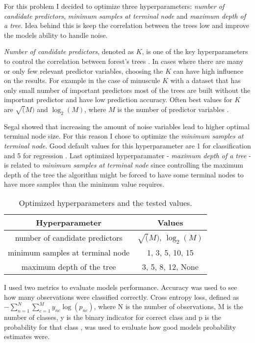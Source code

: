 For this problem I decided to optimize three hyperparameters: \textit{number of candidate predictors}, \textit{minimum samples at terminal node} and \textit{maximum depth of a tree}. Idea behind this is keep the correlation between the trees low and improve the models ability to handle noise.

\textit{Number of candidate predictors}, denoted as $K$, is one of the key hyperparameters to control the correlation between forest's trees \cite{probst2018hyperparameters}.
In cases where there are many or only few relevant predictor variables, choosing the $K$ can have high influence on the results. For example in the case of minuscule $K$ with a dataset that has only small number of important predictors most of the trees are built without the important predictor and have low prediction accuracy. \cite{bernard2009influence} Often best values for $K$ are $\sqrt(M)$ and $\log_2(M)$, where $M$ is the number of predictor variables \cite{bernard2009influence}.

Segal \cite{segal2004machine} showed that increasing the amount of noise variables lead to higher optimal terminal node size. For this reason I chose to optimize the \textit{minimum samples at terminal node}. Good default values for this hyperparameter are 1 for classification and 5 for regression \cite{probst2018hyperparameters}. Last optimized hyperparamater - \textit{maximum depth of a tree} - is related to \textit{minimum samples at terminal node} since controlling the maximum depth of the tree the algorithm might be forced to have some terminal nodes to have more samples than the minimum value requires.

\begin{table}
    \caption{Optimized hyperparameters and the tested values.}
    \begin{tabular}{ | c | c |}
    \hline
    Hyperparameter & Values\\
    \hline
    number of candidate predictors & $\sqrt(M)$, $\log_2(M)$\\
    minimum samples at terminal node & 1, 3, 5, 10, 15\\
    maximum depth of the tree & 3, 5, 8, 12, None\\
    \hline
   \end{tabular}
   \label{tab:hyperparam}
\end{table}

I used two metrics to evaluate models performance. Accuracy was used to see how many observations were classified correctly. Cross entropy loss, defined as $- \sum _ { n = 1 } ^ { N }\sum _ { c = 1 } ^ { M } y _ { nc } \log \left( p _ { nc } \right)$, where N is the number of observations, M is the number of classes, y is the binary indicator for correct class and p is the probability for that class \cite{nasrabadi2007pattern}, was used to evaluate how good models probability estimates were.

